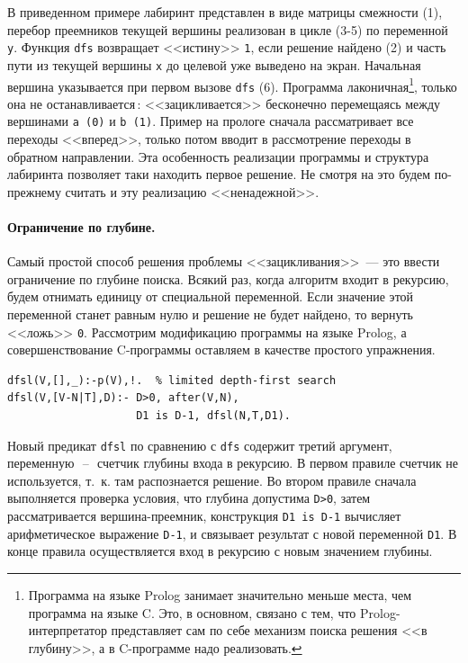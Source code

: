 \documentclass[a4paper,14pt, openany, twoside, draft]{extbook} %
\begin{document}
В приведенном примере лабиринт представлен в виде матрицы смежности (1), перебор преемников текущей вершины реализован в цикле (3-5) по переменной \texttt{y}.  Функция \texttt{dfs} возвращает <<истину>> \texttt{1}, если решение найдено (2) и часть пути из текущей вершины \texttt{x} до целевой уже выведено на экран.  Начальная вершина указывается при первом вызове \texttt{dfs} (6).  Программа лаконичная\footnote{Программа на языке Prolog занимает значительно меньше места, чем программа на языке C.  Это, в основном, связано с тем, что Prolog-интерпретатор представляет сам по себе механизм поиска решения <<в глубину>>, а в C-программе надо реализовать.}, только она не останавливается\,: <<зацикливается>> бесконечно перемещаясь между вершинами \texttt{a~(0)} и \texttt{b~(1)}.  Пример на прологе сначала рассматривает все переходы <<вперед>>, только потом вводит в рассмотрение переходы в обратном направлении.  Эта особенность реализации программы и структура лабиринта позволяет таки находить первое решение.  Не смотря на это будем по-прежнему считать и эту реализацию <<ненадежной>>.

\paragraph{Ограничение по глубине.} Самый простой способ решения проблемы <<зацикливания>>~--- это ввести ограничение по глубине поиска.  Всякий раз, когда алгоритм входит в рекурсию, будем отнимать единицу от специальной переменной.  Если значение этой переменной станет равным нулю и решение не будет найдено, то вернуть <<ложь>> \texttt{0}.  Рассмотрим модификацию программы на языке Prolog, а совершенствование C-программы оставляем в качестве простого упражнения.

\begin{verbatim}
dfsl(V,[],_):-p(V),!.  % limited depth-first search
dfsl(V,[V-N|T],D):- D>0, after(V,N),
                    D1 is D-1, dfsl(N,T,D1).
\end{verbatim}


Новый предикат \texttt{dfsl} по сравнению с \texttt{dfs} содержит третий аргумент, переменную\,~--~\,счетчик глубины входа в рекурсию.  В первом правиле счетчик не используется, т.~к. там распознается решение.  Во втором правиле сначала выполняется проверка условия, что глубина допустима \texttt{D>0}, затем рассматривается вершина-преемник, конструкция \texttt{D1 is D-1} вычисляет арифметическое выражение \texttt{D-1}, и связывает результат с новой переменной \texttt{D1}.  В конце правила осуществляется вход в рекурсию с новым значением глубины.
\end{document}

